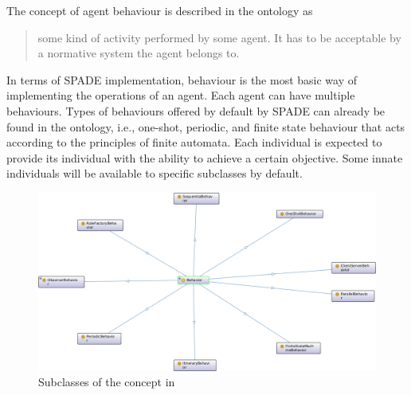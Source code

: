  The concept of agent behaviour is described in the  ontology as \blockquote{\textelp{} some kind of activity performed by some agent. It has to be acceptable by a normative system the agent belongs to.} In terms of SPADE implementation, behaviour is the most basic way of implementing the operations of an agent. Each agent can have multiple behaviours. Types of behaviours offered by default by SPADE can already be found in the  ontology,
%
i.e., one-shot, periodic, and finite state behaviour that acts according to the principles of finite automata. Each  individual is expected to provide its  individual with the ability to achieve a certain objective. Some innate  individuals will be available to specific  subclasses by default.

\begin{figure}
    \centering
    \includegraphics[width=0.84\linewidth]{Deliverables/Phase 1/Figures/Behaviours in ooooaflsmas.png}
    \caption{Subclasses of the  concept in }
    \label{fig: behaviour subclasses in ooooaflsmas}
\end{figure}

